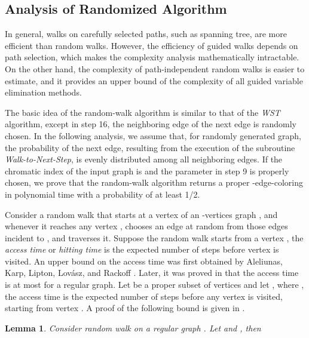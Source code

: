 \documentclass[11pt]{article}
\newtheorem{lemma}[theorem]{Lemma}
\begin{document}
\subsection{Analysis of Randomized Algorithm}

In general, walks on carefully selected paths, such as spanning tree, are more efficient than random walks. However, the efficiency of guided walks depends on path selection, which makes the complexity analysis mathematically intractable. On the other hand, the complexity of path-independent random walks is easier to estimate, and it provides an upper bound of the complexity of all guided variable elimination methods. 

The basic idea of the random-walk algorithm is similar to that of the {\it WST} algorithm, except in step 16, the neighboring edge   of the next edge is randomly chosen. In the following analysis, we assume that, for randomly generated graph, the probability of the next edge, resulting from the execution of the subroutine {\it Walk-to-Next-Step}, is evenly distributed among all neighboring edges. If the chromatic index of the input graph is  and the parameter  in step 9 is properly chosen, we prove that the random-walk algorithm returns a proper -edge-coloring in polynomial time with a probability of at least 1/2. 

Consider a random walk that starts at a vertex  of an -vertices graph , and whenever it reaches any vertex , chooses an edge at random from those edges incident to , and traverses it. Suppose the random walk starts from a vertex  , the {\it access time} or {\it hitting time}  is the expected number of steps before vertex  is visited. An  upper bound on the access time was first obtained by Aleliunas, Karp, Lipton, Lov{\'a}sz, and Rackoff \cite{Aleliunas1979random}. Later, it was proved in \cite{lovsz1993random} that the access time is at most  for a regular graph. Let  be a proper subset of vertices and let , where , the access time  is the expected number of steps before any vertex  is visited, starting from vertex . A proof of the following bound is given in \cite{aldous2002reversible}.

\begin{lemma} 
\label{lemma:hittime}
Consider random walk on a regular graph . Let  and , then       

\end{lemma}
\end{document}

